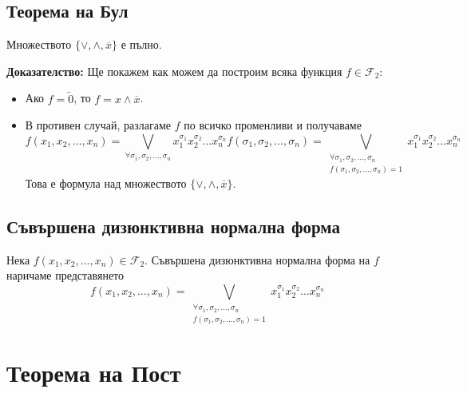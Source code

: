 \documentclass[fleqn,12pt]{article}
\begin{document}
\begin{flushleft}
\subsection{Теорема на Бул}
Множеството $\{ \vee, \wedge, \overline{x} \}$ е пълно.

\textbf{Доказателство: } Ще покажем как можем да построим всяка функция $f \in \mathcal{F}_2$:
\begin{itemize}
    \item Ако $f = \widetilde{0}$, то $f = x \wedge \overline{x}$.
    \item В противен случай, разлагаме $f$ по всичко променливи и получаваме
    \[ f(x_1, x_2, \dots, x_n) = \bigvee_{\forall \sigma_1, \sigma_2, \dots, \sigma_n} x_1^{\sigma_1} x_2^{\sigma_2} \dots x_n^{\sigma_n} f(\sigma_1, \sigma_2, \dots, \sigma_n) =
    \bigvee_{\substack{\forall \sigma_1, \sigma_2, \dots, \sigma_n \\ f(\sigma_1, \sigma_2, \dots, \sigma_n) = 1}} x_1^{\sigma_1} x_2^{\sigma_2} \dots x_n^{\sigma_n}\]
    Това е формула над множеството $\{ \vee, \wedge, \overline{x} \}$.
\end{itemize}

\subsection{Съвършена дизюнктивна нормална форма}
Нека $f(x_1, x_2, \dots, x_n) \in \mathcal{F}_2$. Съвършена дизюнктивна нормална форма на $f$ наричаме представянето
\[ f(x_1, x_2, \dots, x_n) = 
    \bigvee_{\substack{\forall \sigma_1, \sigma_2, \dots, \sigma_n \\ f(\sigma_1, \sigma_2, \dots, \sigma_n) = 1}} x_1^{\sigma_1} x_2^{\sigma_2} \dots x_n^{\sigma_n}\]

\section{Теорема на Пост}


\end{flushleft}
\end{document}
